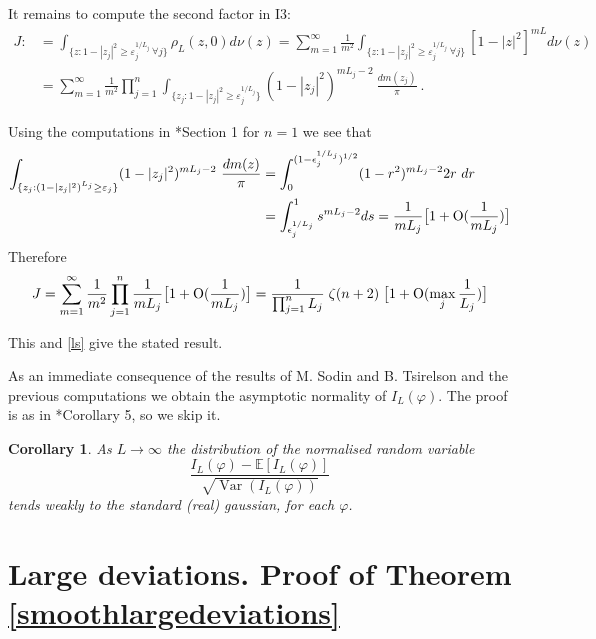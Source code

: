 \documentclass[12pt,twoside,final,amsfonts]{amsart}
\theoremstyle{plain}
\newtheorem{corollary}[theorem]{Corollary}
\theoremstyle{definition}
\theoremstyle{definition}
\begin{document}
It remains to compute the second factor in I3:
\begin{align*}
 J:&=\int_{\{z: 1-|z_j|^2 \geq\varepsilon_{j}^{1/L_j}\ \forall j\}} \rho_L(z,0) d\nu(z)=\sum_{m=1}^\infty\frac 1{m^2} \int_{\{z: 1-|z_j|^2 \geq\varepsilon_{j}^{1/L_j}\ \forall j\}} [1-|z|^2]^{mL} d\nu(z)\\
 &=\sum_{m=1}^\infty\frac 1{m^2} \prod_{j=1}^n \int_{\{z_j: 1-|z_j|^2 \geq\varepsilon_{j}^{1/L_j}\}} (1-|z_j|^2)^{mL_j-2}\ \frac{dm(z_j)}{\pi}\ .
\end{align*}

Using the computations in \cite{BMP}*{Section 1} for $n=1$ we see that
\begin{align*}
 \int_{\{z_j: (1-|z_j|^2)^{L_j} \geq\varepsilon_{j}\}} (1-|z_j|^2)^{mL_j-2}\ \frac{dm(z)}{\pi}&=\int_0^{(1-\epsilon_j^{1/L_j})^{1/2}} (1-r^2)^{mL_j-2} 2r\ dr\\
 &=\int_{\epsilon_j^{1/L_j}}^1 s^{mL_j-2} ds=\frac 1{mL_j}\bigl[1+\textrm O(\frac 1{mL_j})\bigr]
\end{align*}
Therefore
\[
 J=\sum_{m=1}^\infty\frac 1{m^2} \prod_{j=1}^n \frac{1}{m L_j}\bigl[1+\textrm O(\frac 1{mL_j})\bigr]
 =\frac 1{\prod_{j=1}^n L_j}\; \zeta(n+2)\; \bigl[1+\textrm O(\max_j \frac 1{L_j})\bigr]
\]

This and \eqref{ls} give the stated result.

As an immediate consequence of the results of M. Sodin and B. Tsirelson and the previous computations we obtain the asymptotic normality of $I_L(\varphi)$. The proof is as in \cite{BMP}*{Corollary 5}, so we skip it.

\begin{corollary}\label{normality} As $L\to\infty$ the distribution of the normalised random variable
 \[
\frac{I_L(\varphi)-{\mathbb{E}}[I_L(\varphi)]}{\sqrt{{\operatorname{Var}}(I_L(\varphi))}}
\]
tends weakly to the standard (real) gaussian, for each $\varphi$.
\end{corollary}

\section{Large deviations. Proof of Theorem \ref{smoothlargedeviations}}
\end{document}
